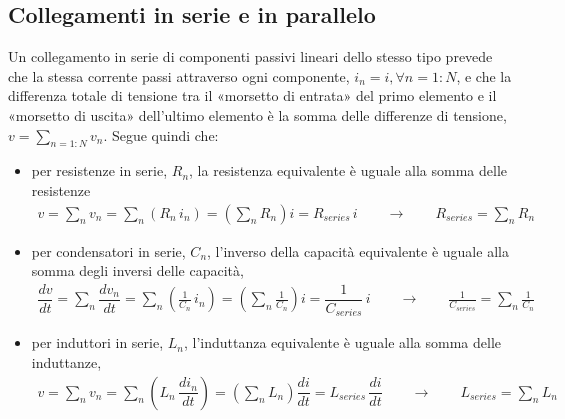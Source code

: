 \documentclass[letterpaper,10pt,italian]{jupyterBook}
\begin{document}
\subsection{Collegamenti in serie e in parallelo}
\label{\detokenize{ch/electromagnetism/circuits-electric:collegamenti-in-serie-e-in-parallelo}}\label{\detokenize{ch/electromagnetism/circuits-electric:physics-hs-electromagnetism-circuits-electric-components-configurations}}
\sphinxAtStartPar
{} Un collegamento in serie di componenti passivi lineari dello stesso tipo prevede che la stessa corrente passi attraverso ogni componente, \(i_n = i, \forall n=1:N\), e che la differenza totale di tensione tra il «morsetto di entrata» del primo elemento e il «morsetto di uscita» dell’ultimo elemento è la somma delle differenze di tensione, \(v = \sum_{n=1:N} v_n\). Segue quindi che:
\begin{itemize}
\item {} 
\sphinxAtStartPar
per resistenze in serie, \(R_n\), la resistenza equivalente è uguale alla somma delle resistenze
\begin{equation*}
\begin{split}v = \sum_n v_n = \sum_n \left( R_n \, i_n \right) = \left( \sum_n R_n \right) i = R_{series} \, i \qquad \rightarrow \qquad R_{series} = \sum_n R_n\end{split}
\end{equation*}
\item {} 
\sphinxAtStartPar
per condensatori in serie, \(C_n\), l’inverso della capacità equivalente è uguale alla somma degli inversi delle capacità,
\begin{equation*}
\begin{split}\dfrac{d v}{dt} = \sum_n \dfrac{d v_n}{dt} = \sum_n \left( \frac{1}{C_n} \, i_n \right) = \left( \sum_n \frac{1}{C_n} \right) i = \dfrac{1}{C_{series}} \, i \qquad \rightarrow \qquad \frac{1}{C_{series}} = \sum_n \frac{1}{C_n}\end{split}
\end{equation*}
\item {} 
\sphinxAtStartPar
per induttori in serie, \(L_n\), l’induttanza equivalente è uguale alla somma delle induttanze,
\begin{equation*}
\begin{split}v = \sum_n v_n = \sum_n \left( L_n \, \dfrac{d i_n}{d t} \right) = \left( \sum_n L_n \right) \dfrac{d i}{dt} = L_{series} \, \dfrac{d i}{dt} \qquad \rightarrow \qquad L_{series} = \sum_n L_n\end{split}
\end{equation*}
\end{itemize}
\end{document}
